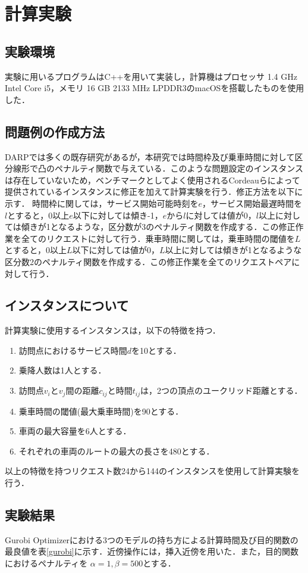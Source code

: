 \documentclass[a4j,11pt,twocolumn]{jsarticle}
\begin{document}
\section{計算実験}
\subsection{実験環境}
実験に用いるプログラムはC++を用いて実装し，計算機はプロセッサ 1.4 GHz Intel Core i5，メモリ 16 GB 2133 MHz LPDDR3のmacOSを搭載したものを使用した．
\subsection{問題例の作成方法}
DARPでは多くの既存研究があるが，本研究では時間枠及び乗車時間に対して区分線形で凸のペナルティ関数で与えている．このような問題設定のインスタンスは存在していないため，ベンチマークとしてよく使用されるCordeauらによって提供されている\cite{tabu}インスタンスに修正を加えて計算実験を行う．修正方法を以下に示す．
時間枠に関しては，サービス開始可能時刻を$e$，サービス開始最遅時間を$l$とすると，0以上$e$以下に対しては傾き-1，$e$から$l$に対しては値が0，$l$以上に対しては傾きが1となるような，区分数が3のペナルティ関数を作成する．この修正作業を全てのリクエストに対して行う．乗車時間に関しては，乗車時間の閾値を$L$とすると，0以上$L$以下に対しては値が0，$L$以上に対しては傾きが1となるような区分数2のペナルティ関数を作成する．この修正作業を全てのリクエストペアに対して行う．
\subsection{インスタンスについて}
計算実験に使用するインスタンスは，以下の特徴を持つ．
\begin{enumerate}
 \item 訪問点におけるサービス時間$d$を10とする．
 \item 乗降人数は1人とする．
 \item 訪問点$v_i$と$v_j$間の距離$c_{ij}$と時間$t_{ij}$は，2つの頂点のユークリッド距離とする．
 \item 乗車時間の閾値(最大乗車時間)を90とする．
 \item 車両の最大容量を6人とする．
 \item それぞれの車両のルートの最大の長さを480とする．
\end{enumerate}
以上の特徴を持つリクエスト数24から144のインスタンスを使用して計算実験を行う．

\subsection{実験結果}
Gurobi Optimizerにおける3つのモデルの持ち方による計算時間及び目的関数の最良値を表\ref{gurobi}に示す．近傍操作には，挿入近傍を用いた．また，目的関数におけるペナルティを $α=1, β=500$とする．
\end{document}
